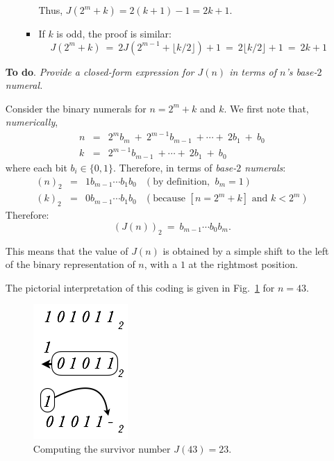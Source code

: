 \begin{itemize}
\begin{itemize}
\begin{itemize}
Thus, $J(2^m+k) = 2(k+1) -1 = 2k+1$.

\item 
If $k$ is odd, the proof is similar:
\[ J(2^m+k) \ = \ 2J(2^{m-1}+\lfloor k/2 \rfloor)+1 \ = \ 2\lfloor k/2 \rfloor +1 \ = \ 2k+1 \]
\end{itemize}

\end{itemize}

\medskip

{\bf To do}. {\em Provide a closed-form expression for $J(n)$ in terms of $n$'s base-$2$ numeral.}

\medskip

Consider the binary numerals for $n = 2^m +k$ and $k$.  We first note that, {\em numerically},
\begin{eqnarray*}
n & = & 2^m b_m \ + \ 2^{m-1} b_{m-1} \ + \cdots + \ 2 b_1 \ + \ b_0 \\
k & = & 2^{m-1}  b_{m-1} \ + \cdots + \ 2 b_1 \ + \ b_0
\end{eqnarray*} 
where each bit $b_i \in \{0,1\}$.  Therefore, in terms of {\em base-$2$ numerals}:
\[ \begin{array}{ccrl}
(n)_2 & = & 1 b_{m-1} \cdots b_1 b_0 & (\mbox{by definition, } \ b_m=1) \\ 
(k)_2 & = & 0 b_{m-1} \cdots b_1 b_0 & (\mbox{because } [n = 2^m +k] \mbox{ and } k < 2^m)
\end{array}
\]
Therefore:
\[ (J(n))_2 \ = \ b_{m-1} \cdots b_0 b_m. \]

This means that the value of $J(n)$ is obtained by a simple shift to the left of the binary representation of $n$, with a $1$ at the rightmost position.

\smallskip

The pictorial interpretation of this coding is given in Fig.~\ref{fig:josephusCoding} for $n=43$.
\begin{figure}[h]
\begin{center}
        \includegraphics[scale=0.35]{FiguresMaths/josephusCoding}
        \caption{Computing the survivor number $J(43)=23$.}
        \label{fig:josephusCoding}
\end{center}
\end{figure}

\end{itemize}

